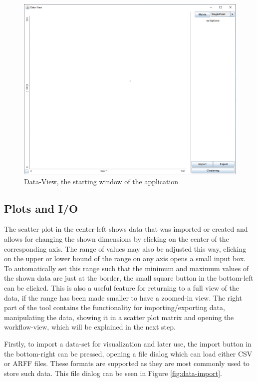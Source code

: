 \documentclass[
	a4paper,
	english,
	twoside,
	openright,               
	11pt                            
	]{report}
\begin{document}
\begin{figure}[h]
	\centering
	\includegraphics[scale=.5]{data-view}
	\caption{Data-View, the starting window of the application}
	\label{fig:data-view}
\end{figure}

\subsection{Plots and I/O}\label{sec:plotio}

The scatter plot in the center-left shows data that was imported or created and allows for changing the shown dimensions by clicking on the center of the corresponding axis. The range of values may also be adjusted this way, clicking on the upper or lower bound of the range on any axis opens a small input box. To automatically set this range such that the minimum and maximum values of the shown data are just at the border, the small square button in the bottom-left can be clicked. This is also a useful feature for returning to a full view of the data, if the range has been made smaller to have a zoomed-in view. The right part of the tool contains the functionality for importing/exporting data, manipulating the data, showing it in a scatter plot matrix and opening the workflow-view, which will be explained in the next step.

Firstly, to import a data-set for visualization and later use, the import button in the bottom-right can be pressed, opening a file dialog which can load either CSV or ARFF files. These formats are supported as they are most commonly used to store such data. This file dialog can be seen in Figure \ref{fig:data-import}. 
\end{document}
